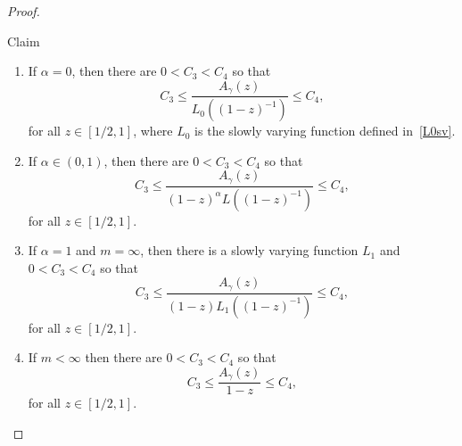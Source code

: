 \documentclass[AHL,Unicode,longabstracts]{cedram}
\newcommand{\ga}{\alpha}
\newcommand{\gga}{\gamma}
\newcommand*{\alphenumi}{\renewcommand*{\theenumi}{\alph{enumi}}}
\begin{document}
\begin{proof}
\begin{enonce*}{Claim} 
\begin{enumerate}\alphenumi
\item \label{c1} If $\ga = 0$, then there are $0 < C_3 < C_4$ so that
\begin{equation}\label{claim_a_zero}
C_3 \leq \frac{A_\gga(z)}{L_0((1 - z)^{-1})} \leq C_4,
\end{equation}
for all $z \in [1/2,1]$, where $L_0$ is the slowly varying function defined in~\eqref{L0sv}.
\item \label{c2} If $\ga \in (0,1)$, then there are $0 < C_3 < C_4$ so that
\begin{equation}
C_3 \leq \frac{A_\gga(z)}{(1 - z)^\ga L((1 - z)^{-1})} \leq C_4,
\end{equation}
for all $z \in [1/2,1]$.
\item \label{c3} If $\ga = 1$ and $m = \infty$, then there is a slowly varying function $L_1$ and $0 < C_3 < C_4$ so that
\begin{equation}
C_3 \leq \frac{A_\gga(z)}{(1 - z) L_1((1 - z)^{-1})} \leq C_4,
\end{equation}
for all $z \in [1/2,1]$.
\item \label{c4} If $m < \infty$ then there are $0 < C_3 < C_4$ so that
\begin{equation}
C_3 \leq \frac{A_\gga(z)}{1 - z} \leq C_4,
\end{equation}
for all $z\in[1/2, 1]$.
\end{enumerate}
\end{enonce*}


\end{proof}
\end{document}
